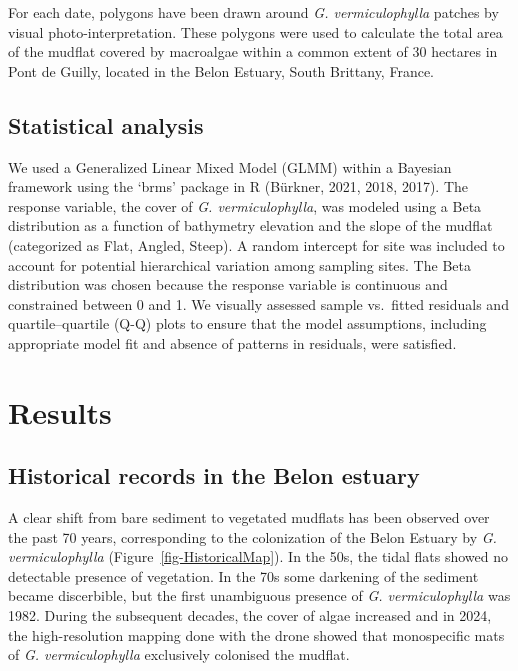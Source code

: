 \documentclass[
  letterpaper,
  DIV=11,
  numbers=noendperiod]{scrartcl}
\begin{document}
For each date, polygons have been drawn around \emph{G. vermiculophylla}
patches by visual photo-interpretation. These polygons were used to
calculate the total area of the mudflat covered by macroalgae within a
common extent of 30 hectares in Pont de Guilly, located in the Belon
Estuary, South Brittany, France.

\subsection{Statistical analysis}\label{statistical-analysis}

We used a Generalized Linear Mixed Model (GLMM) within a Bayesian
framework using the `brms' package in R (Bürkner, 2021, 2018, 2017). The
response variable, the cover of \emph{G. vermiculophylla}, was modeled
using a Beta distribution as a function of bathymetry elevation and the
slope of the mudflat (categorized as Flat, Angled, Steep). A random
intercept for site was included to account for potential hierarchical
variation among sampling sites. The Beta distribution was chosen because
the response variable is continuous and constrained between 0 and 1. We
visually assessed sample vs.~fitted residuals and quartile--quartile
(Q-Q) plots to ensure that the model assumptions, including appropriate
model fit and absence of patterns in residuals, were satisfied.

\section{Results}\label{results}

\subsection{Historical records in the Belon
estuary}\label{historical-records-in-the-belon-estuary}

A clear shift from bare sediment to vegetated mudflats has been observed
over the past 70 years, corresponding to the colonization of the Belon
Estuary by \emph{G. vermiculophylla} (Figure~\ref{fig-HistoricalMap}).
In the 50s, the tidal flats showed no detectable presence of vegetation.
In the 70s some darkening of the sediment became discerbible, but the
first unambiguous presence of \emph{G. vermiculophylla} was 1982. During
the subsequent decades, the cover of algae increased and in 2024, the
high-resolution mapping done with the drone showed that monospecific
mats of \emph{G. vermiculophylla} exclusively colonised the mudflat.
\end{document}
